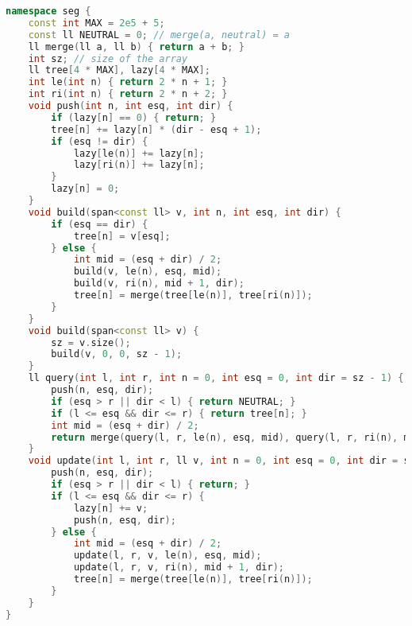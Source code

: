 \documentclass[11pt, a4paper, twoside]{article}
\begin{document}
\begin{lstlisting}[language=C++]
namespace seg {
    const int MAX = 2e5 + 5;
    const ll NEUTRAL = 0; // merge(a, neutral) = a
    ll merge(ll a, ll b) { return a + b; }
    int sz; // size of the array
    ll tree[4 * MAX], lazy[4 * MAX];
    int le(int n) { return 2 * n + 1; }
    int ri(int n) { return 2 * n + 2; }
    void push(int n, int esq, int dir) {
        if (lazy[n] == 0) { return; }
        tree[n] += lazy[n] * (dir - esq + 1);
        if (esq != dir) {
            lazy[le(n)] += lazy[n];
            lazy[ri(n)] += lazy[n];
        }
        lazy[n] = 0;
    }
    void build(span<const ll> v, int n, int esq, int dir) {
        if (esq == dir) {
            tree[n] = v[esq];
        } else {
            int mid = (esq + dir) / 2;
            build(v, le(n), esq, mid);
            build(v, ri(n), mid + 1, dir);
            tree[n] = merge(tree[le(n)], tree[ri(n)]);
        }
    }
    void build(span<const ll> v) {
        sz = v.size();
        build(v, 0, 0, sz - 1);
    }
    ll query(int l, int r, int n = 0, int esq = 0, int dir = sz - 1) {
        push(n, esq, dir);
        if (esq > r || dir < l) { return NEUTRAL; }
        if (l <= esq && dir <= r) { return tree[n]; }
        int mid = (esq + dir) / 2;
        return merge(query(l, r, le(n), esq, mid), query(l, r, ri(n), mid + 1, dir));
    }
    void update(int l, int r, ll v, int n = 0, int esq = 0, int dir = sz - 1) {
        push(n, esq, dir);
        if (esq > r || dir < l) { return; }
        if (l <= esq && dir <= r) {
            lazy[n] += v;
            push(n, esq, dir);
        } else {
            int mid = (esq + dir) / 2;
            update(l, r, v, le(n), esq, mid);
            update(l, r, v, ri(n), mid + 1, dir);
            tree[n] = merge(tree[le(n)], tree[ri(n)]);
        }
    }
}
\end{lstlisting}
\end{document}
